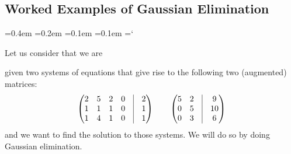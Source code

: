 
\subsection*{Worked Examples of Gaussian Elimination}

{\ttfamily
{}\font=0.4em
\font=0.2em
\font=0.1em
\font=0.1em
\hyphenchar\font=`\-

\hypertarget{scripts_elementary_row_operations_worked_examples}{Let us consider that we are} given two systems of equations that give rise to the following two (augmented) matrices:
\begin{align*}
\begin{pmatrix}
2 & 5 & 2 & 0 & \vline & 2 \\
1 & 1 & 1 & 0 & \vline & 1 \\
1 & 4 & 1 & 0 & \vline & 1
\end{pmatrix}
\quad\quad
\begin{pmatrix}
5 & 2 & \vline & 9 \\
0 & 5 & \vline & 10 \\
0 & 3 & \vline & 6
\end{pmatrix}
\end{align*}
and we want to find the solution to those systems. We will do so by doing Gaussian elimination.

}
